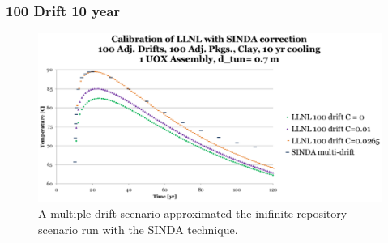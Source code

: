 \begin{frame}[ctb!]
  \frametitle{100 Drift 10 year}
  \begin{figure}[h]
    \begin{center}
      \includegraphics[width=.8\textwidth]{100drift10yr.eps}
      \caption{A multiple drift scenario approximated the inifinite repository 
      scenario run with the SINDA technique.}
    \end{center}
    \label{fig:100drift10yr}
  \end{figure}
\end{frame}

